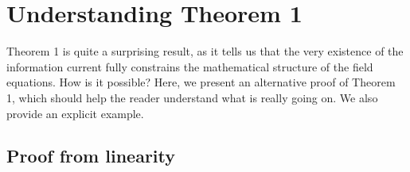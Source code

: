 \documentclass[aps,prl,singlecolumn,nofootinbib]{revtex4-2}
\theoremstyle{definition}
\theoremstyle{theorem}
\begin{document}

\section{Understanding Theorem 1} 

Theorem 1 is quite a surprising result, as it tells us that the very existence of the information current fully constrains the mathematical structure of the field equations. How is it possible? Here, we present an alternative proof of Theorem 1, which should help the reader understand what is really going on. We also provide an explicit example.


\subsection{Proof from linearity}
\end{document}
